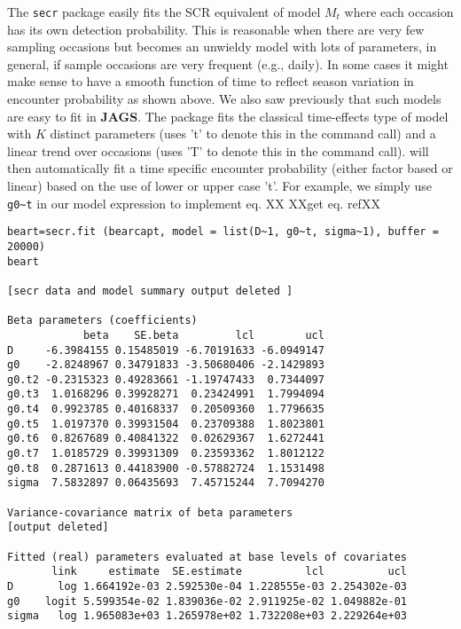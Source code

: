 The \mbox{\tt secr} package easily fits the SCR equivalent of model
$M_{t}$ where each
occasion has its own detection probability. This is reasonable when
there are very few sampling occasions but becomes an unwieldy model
with lots of parameters, in general, if sample occasions are very
frequent (e.g., daily). In some cases it might make sense to have a
smooth function of time to reflect season variation in encounter
probability as shown above. We also saw previously that such models are easy
to fit in {\bf JAGS}.  The package \secr fits the classical
time-effects type of model with $K$ distinct parameters (\secr uses 't' to denote
this in the command call) and a linear
trend over occasions (\secr uses 'T' to denote this in the command call). 
\secr will then automatically fit a time
specific encounter probability (either factor based or linear) based on the use
of lower or upper case 't'.  For example, we simply use \verb+g0~t+ in 
our model expression to implement eq. XX   XXget eq. refXX


{\small
\begin{verbatim}
beart=secr.fit (bearcapt, model = list(D~1, g0~t, sigma~1), buffer = 20000) 
beart

[secr data and model summary output deleted ]

Beta parameters (coefficients) 
            beta    SE.beta         lcl        ucl
D     -6.3984155 0.15485019 -6.70191633 -6.0949147
g0    -2.8248967 0.34791833 -3.50680406 -2.1429893
g0.t2 -0.2315323 0.49283661 -1.19747433  0.7344097
g0.t3  1.0168296 0.39928271  0.23424991  1.7994094
g0.t4  0.9923785 0.40168337  0.20509360  1.7796635
g0.t5  1.0197370 0.39931504  0.23709388  1.8023801
g0.t6  0.8267689 0.40841322  0.02629367  1.6272441
g0.t7  1.0185729 0.39931309  0.23593362  1.8012122
g0.t8  0.2871613 0.44183900 -0.57882724  1.1531498
sigma  7.5832897 0.06435693  7.45715244  7.7094270

Variance-covariance matrix of beta parameters 
[output deleted]

Fitted (real) parameters evaluated at base levels of covariates 
       link     estimate  SE.estimate          lcl          ucl
D       log 1.664192e-03 2.592530e-04 1.228555e-03 2.254302e-03
g0    logit 5.599354e-02 1.839036e-02 2.911925e-02 1.049882e-01
sigma   log 1.965083e+03 1.265978e+02 1.732208e+03 2.229264e+03
\end{verbatim}
}


